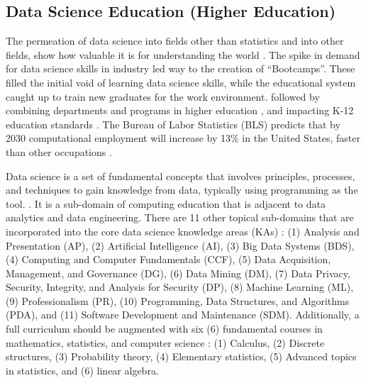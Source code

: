 \documentclass[010-intro.tex]{subfiles}
\begin{document}
\subsection{Data Science Education (Higher Education)}

    The permeation of data science into fields other than statistics and into other fields,
    show how valuable it is for understanding the world
    \cite{clevelandDataScienceAction2001}.
    The spike in demand for data science skills in industry led way to the creation of
    ``Bootcamps''.
    These filled the initial void of learning data science skills,
    while the educational system caught up to train new graduates for the work environment.
    followed by combining departments and programs in higher education
    \cite{krossDemocratizationDataScience2020},
    and impacting K-12 education standards
    \cite{csta, gaise2k12}.
    The Bureau of Labor Statistics (BLS)
    predicts that by 2030 computational employment will increase by 13\% in the United States,
    faster than other occupations
    \cite{cc2020, blsOccupationalOutlook}.

    Data science is a set of fundamental concepts that involves
    principles, processes, and techniques to gain knowledge from data, typically using programming as the tool.
    \cite{cc2020, ccdsc2021, provostDataScienceBusiness2013}.
    It is a sub-domain of computing education that is adjacent to data analytics and data engineering.
    There are 11 other topical sub-domains that are incorporated into the core data science knowledge areas (KAs)
    \cite{cc2020, ccdsc2021}:
    (1) Analysis and Presentation (AP),
    (2) Artificial Intelligence (AI),
    (3) Big Data Systems (BDS),
    (4) Computing and Computer Fundamentals (CCF),
    (5) Data Acquisition, Management, and Governance (DG),
    (6) Data Mining (DM),
    (7) Data Privacy, Security, Integrity, and Analysis for Security (DP),
    (8) Machine Learning (ML),
    (9) Professionalism (PR),
    (10) Programming, Data Structures, and Algorithms (PDA), and
    (11) Software Development and Maintenance (SDM).
    Additionally, a full curriculum should be augmented with six (6) fundamental courses in
    mathematics, statistics, and computer science
    \cite{cc2020, ccdsc2021}:
    (1) Calculus,
    (2) Discrete structures,
    (3) Probability theory,
    (4) Elementary statistics,
    (5) Advanced topics in statistics, and
    (6) linear algebra.
\end{document}
